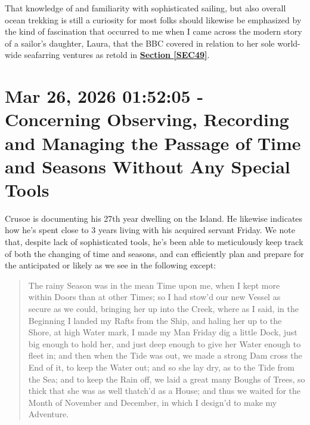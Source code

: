 \documentclass[a4paper]{article}
\begin{document}
That knowledge of and familiarity with sophisticated sailing, but also overall ocean trekking is still a curiosity for most folks should likewise be emphasized by the kind of fascination that occurred to me when I came across the modern story of a sailor's daughter, Laura, that the BBC covered in relation to her sole world-wide seafarring ventures as retold in \textbf{\hyperref[SEC49]{Section \ref{SEC49}}}.





\section{Mar 26, 2026 01:52:05 - Concerning Observing, Recording and Managing the Passage of Time and Seasons Without Any Special Tools}
\label{SEC61}

Crusoe is documenting his 27th year dwelling on the Island. He likewise indicates how he's spent close to 3 years  living with his acquired servant Friday. We note that, despite lack of sophisticated tools, he's been able to meticulously keep track of both the changing of time and seasons, and can efficiently plan and prepare for the anticipated or likely as we see in the following except:


\noindent
\begin{minipage}{1\textwidth}
\vspace{1em}
\begin{quotation}
{\ttfamily


The rainy Season was in the mean Time upon me, when I kept more within Doors than at other Times; so I had stow’d our new Vessel as secure as we could, bringing her up into the Creek, where as I said, in the Beginning I landed my Rafts from the Ship, and haling her up to the Shore, at high Water mark, I made my Man Friday dig a little Dock, just big enough to hold her, and just deep enough to give her Water enough to fleet in; and then when the Tide was out, we made a strong Dam cross the End of it, to keep the Water out; and so she lay dry, as to the Tide from the Sea; and to keep the Rain off, we laid a great many Boughs of Trees, so thick that she was as well thatch’d as a House; and thus we waited for the Month of November and December, in which I design’d to make my Adventure.


}
\end{quotation}
\vspace{1em}
\end{minipage}
\end{document}
